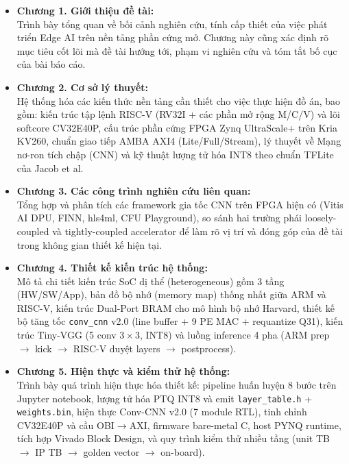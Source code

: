 \begin{itemize}
    \item \textbf{Chương 1. Giới thiệu đề tài:} \\
    Trình bày tổng quan về bối cảnh nghiên cứu, tính cấp thiết của việc phát triển Edge AI trên nền tảng phần cứng mở. Chương này cũng xác định rõ mục tiêu cốt lõi mà đề tài hướng tới, phạm vi nghiên cứu và tóm tắt bố cục của bài báo cáo.

    \item \textbf{Chương 2. Cơ sở lý thuyết:} \\
    Hệ thống hóa các kiến thức nền tảng cần thiết cho việc thực hiện đồ án, bao gồm: kiến trúc tập lệnh RISC-V (RV32I + các phần mở rộng M/C/V) và lõi softcore CV32E40P, cấu trúc phần cứng FPGA Zynq UltraScale+ trên Kria KV260, chuẩn giao tiếp AMBA AXI4 (Lite/Full/Stream), lý thuyết về Mạng nơ-ron tích chập (CNN) và kỹ thuật lượng tử hóa INT8 theo chuẩn TFLite của Jacob et al.

    \item \textbf{Chương 3. Các công trình nghiên cứu liên quan:} \\
    Tổng hợp và phân tích các framework gia tốc CNN trên FPGA hiện có (Vitis AI DPU, FINN, hls4ml, CFU Playground), so sánh hai trường phái loosely-coupled và tightly-coupled accelerator để làm rõ vị trí và đóng góp của đề tài trong không gian thiết kế hiện tại.

    \item \textbf{Chương 4. Thiết kế kiến trúc hệ thống:} \\
    Mô tả chi tiết kiến trúc SoC dị thể (heterogeneous) gồm 3 tầng (HW/SW/App), bản đồ bộ nhớ (memory map) thống nhất giữa ARM và RISC-V, kiến trúc Dual-Port BRAM cho mô hình bộ nhớ Harvard, thiết kế bộ tăng tốc \texttt{conv\_cnn} v2.0 (line buffer + 9 PE MAC + requantize Q31), kiến trúc Tiny-VGG (5 conv $3\times3$, INT8) và luồng inference 4 pha (ARM prep $\rightarrow$ kick $\rightarrow$ RISC-V duyệt layers $\rightarrow$ postprocess).

    \item \textbf{Chương 5. Hiện thực và kiểm thử hệ thống:} \\
    Trình bày quá trình hiện thực hóa thiết kế: pipeline huấn luyện 8 bước trên Jupyter notebook, lượng tử hóa PTQ INT8 và emit \texttt{layer\_table.h} + \texttt{weights.bin}, hiện thực Conv-CNN v2.0 (7 module RTL), tinh chỉnh CV32E40P và cầu OBI$\to$AXI, firmware bare-metal C, host PYNQ runtime, tích hợp Vivado Block Design, và quy trình kiểm thử nhiều tầng (unit TB $\rightarrow$ IP TB $\rightarrow$ golden vector $\rightarrow$ on-board).


\end{itemize}
